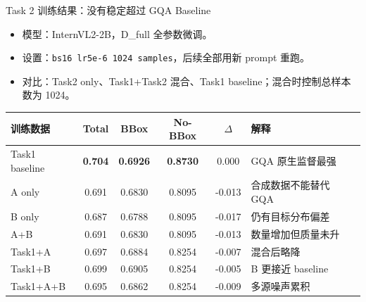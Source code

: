 \documentclass{beamer}
\newcommand{\smalltab}{\scriptsize}
\begin{document}
\begin{frame}{Task 2 训练结果：没有稳定超过 GQA Baseline}
\small
\begin{itemize}
\item 模型：InternVL2-2B，D\_full 全参数微调。
\item 设置：\texttt{bs16 lr5e-6 1024 samples}，后续全部用新 prompt 重跑。
\item 对比：Task2 only、Task1+Task2 混合、Task1 baseline；混合时控制总样本数为 1024。
\end{itemize}
\smalltab
\begin{tabular}{p{}ccccp{}}
\toprule
训练数据 & Total & BBox & No-BBox & $\Delta$ & 解释 \\
\midrule
Task1 baseline & \textbf{0.704} & \textbf{0.6926} & \textbf{0.8730} & 0.000 & GQA 原生监督最强 \\
A only & 0.691 & 0.6830 & 0.8095 & -0.013 & 合成数据不能替代 GQA \\
B only & 0.687 & 0.6788 & 0.8095 & -0.017 & 仍有目标分布偏差 \\
A+B & 0.691 & 0.6830 & 0.8095 & -0.013 & 数量增加但质量未升 \\
Task1+A & 0.697 & 0.6884 & 0.8254 & -0.007 & 混合后略降 \\
Task1+B & 0.699 & 0.6905 & 0.8254 & -0.005 & B 更接近 baseline \\
Task1+A+B & 0.695 & 0.6862 & 0.8254 & -0.009 & 多源噪声累积 \\
\bottomrule
\end{tabular}
\end{frame}
\end{document}
